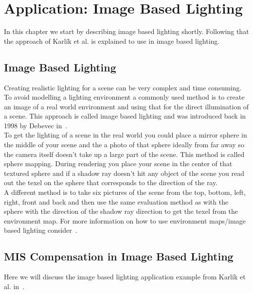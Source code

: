 \chapter{Application: Image Based Lighting}
\label{ch:application_ibl}
In this chapter we start by describing image based lighting shortly.
Following that the approach of Karl\'ik et al. is explained to use in image based lighting.


\section{Image Based Lighting}
\label{sec:ibl}
Creating realistic lighting for a scene can be very complex and time consuming.
To avoid modelling a lighting environment a commonly used method is to create an image of a real world environment
and using that for the direct illumination of a scene.
This approach is called image based lighting and was introduced back in 1998 by Debevec in~\cite{debevec}.\\
To get the lighting of a scene in the real world you could place a mirror sphere in the middle of your scene
and the a photo of that sphere ideally from far away
so the camera itself doesn't take up a large part of the scene.
This method is called sphere mapping.
During rendering you place your scene in the center of that textured sphere
and if a shadow ray doesn't hit any object of the scene you read out the texel
on the sphere that corresponds to the direction of the ray.\\
A different method is to take six pictures of the scene from the top, bottom, left, right, front and back
and then use the same evaluation method as with the sphere with the direction of the shadow ray direction
to get the texel from the environment map.
For more information on how to use environment maps/image based lighting consider~\cite{environment_map}.


\section{MIS Compensation in Image Based Lighting}
\label{sec:misc_ibl}
Here we will discuss the image based lighting application example from Karl\'ik et al. in~\cite[Section~6-7]{Karlik2019}.


